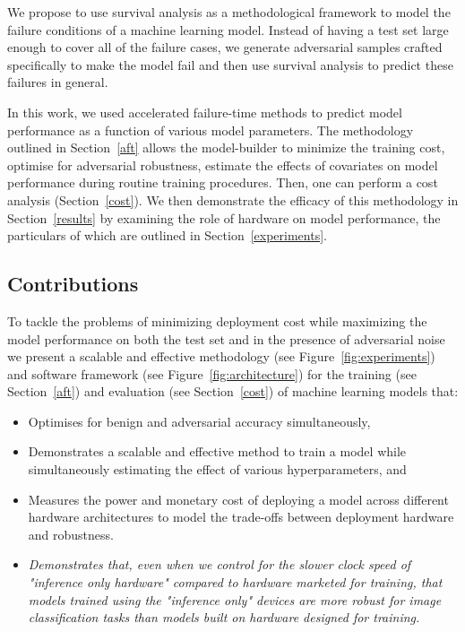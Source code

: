 \documentclass[conference]{IEEEtran}
\newcommand{\cm}[1]{\textit{{\color{blue}#1}}}
\begin{document}
We propose to use survival analysis as a methodological framework to model the failure conditions of a machine learning model. Instead of having a test set large enough to cover all of the failure cases, we generate adversarial samples crafted specifically to make the model fail and then use survival analysis to predict these failures in general.

In this work, we used accelerated failure-time methods to predict model performance as a function of various model parameters. The methodology outlined in Section~\ref{aft} allows the model-builder to minimize the training cost, optimise for adversarial robustness, estimate the effects of covariates on model performance during routine training procedures. Then, one can perform a cost analysis (Section~\ref{cost}). We then demonstrate the efficacy of this methodology in Section~\ref{results} by examining the role of hardware on model performance, the particulars of which are outlined in Section~\ref{experiments}.


\subsection{Contributions}
To tackle the problems of minimizing deployment cost while maximizing the model performance on both the test set and in the presence of adversarial noise we present a scalable and effective methodology (see  Figure~\ref{fig:experiments}) and software framework (see Figure~\ref{fig:architecture}) for the training (see Section~\ref{aft}) and evaluation (see Section~\ref{cost}) of machine learning models that:
\begin{itemize}
    \item Optimises for benign and adversarial accuracy simultaneously,
    \item Demonstrates a scalable and effective method to train a model while simultaneously estimating the effect of various hyperparameters, and
    \item Measures the power and monetary cost of deploying a model across different hardware architectures to model the trade-offs between deployment hardware and robustness.
    \item \cm{Demonstrates that, even when we control for the slower clock speed of "inference only hardware" compared to hardware marketed for training, that models trained using the "inference only" devices are more robust for image classification tasks than models built on hardware designed for training.}
\end{itemize}
\end{document}
